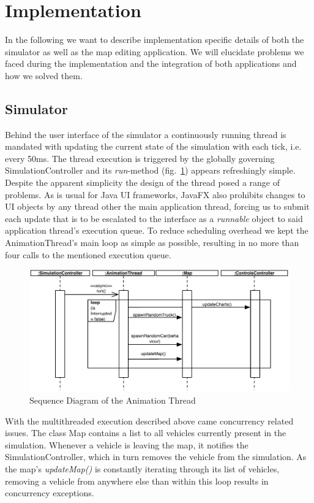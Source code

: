 \section{Implementation}
In the following we want to describe implementation specific details of both the simulator as well as the map editing application. We will elucidate problems we faced during the implementation and the integration of both applications and how we solved them. 
\subsection{Simulator}
Behind the user interface of the simulator a continuously running thread is mandated with updating the current state of the simulation with each tick, i.e. every 50ms. The thread execution is triggered by the globally governing SimulationController and its \textit{run}-method (fig.~\ref{fig:animthread}) appears refreshingly simple. Despite the apparent simplicity the design of the thread posed a range of problems. As is usual for Java UI frameworks, JavaFX also prohibits changes to UI objects by any thread other the main application thread, forcing us to submit each update that is to be escalated to the interface as a \textit{runnable} object to said application thread's execution queue. To reduce scheduling overhead we kept the AnimationThread's main loop as simple as possible, resulting in no more than four calls to the mentioned execution queue. 

\begin{figure}[h]
	\begin{center}
		\includegraphics[width=\textwidth]{img/SD_animThread.pdf}
		\caption[Sequence Diagram of the Animation Thread]{Sequence Diagram of the Animation Thread}
		\label{fig:animthread}
	\end{center}
\end{figure}

With the multithreaded execution described above came concurrency related issues. The class Map contains a list to all vehicles currently present in the simulation. Whenever a vehicle is leaving the map, it notifies the SimulationController, which in turn removes the vehicle from the simulation. As the map's \textit{updateMap()} is constantly iterating through its list of vehicles, removing a vehicle from anywhere else than within this loop results in concurrency exceptions.

